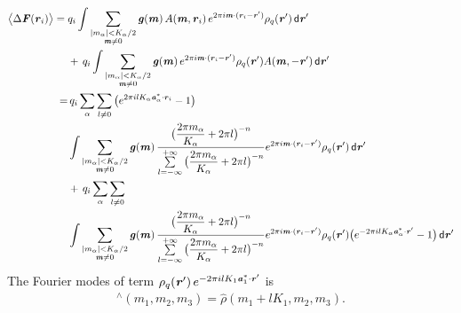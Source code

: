 \documentclass[aps,pre,preprint]{revtex4}
\renewcommand{\v}[1]{\textbf{\textit{#1}}}
\renewcommand{\d}[1]{\textsf{#1}}
\begin{document}
\begin{align}\nonumber
  \big\langle
  \Delta\v F(\v r_i)
  \big\rangle
  =\;&
  q_i
  \int 
  \sum_{
    \begin{subarray}{c}
      \vert m_{\alpha}\vert < K_\alpha/2\\
      \v m\neq 0
    \end{subarray}}
  \v g(\v m)\,
  A(\v m, \v r_i)\,
  e^{2\pi i\v m\cdot (\v r_i - \v r')}
  \rho_q(\v r')\,\d d\v r' \\ \nonumber
  & +\,
  q_i
  \int
  \sum_{
    \begin{subarray}{c}
      \vert m_{\alpha}\vert < K_\alpha/2\\
      \v m\neq 0
    \end{subarray}}
  \v g(\v m)\,
  e^{2\pi i\v m\cdot (\v r_i - \v r')}
  \rho_q(\v r')A(\v m, -\v r')\,\d d\v r' \\\nonumber
  = &\,
  q_i\sum_{\alpha}\sum_{l\neq 0}
  \big(
  e^{2\pi i l K_\alpha\v a^\ast_\alpha\cdot \v r_i} - 1
  \big) \\\nonumber
  &
  \int 
  \sum_{
    \begin{subarray}{c}
      \vert m_{\alpha}\vert < K_\alpha/2\\
      \v m\neq 0
    \end{subarray}}
  \v g(\v m)\,
  \frac
  {\big(\dfrac{2\pi m_\alpha}{K_\alpha} + 2\pi l\big)^{-n}}
  {\sum\limits_{l=-\infty}^{+\infty}
    \big(\dfrac{2\pi m_\alpha}{K_\alpha} + 2\pi l\big)^{-n}}
  e^{2\pi i\v m\cdot (\v r_i - \v r')}
  \rho_q(\v r')\,\d d\v r' \\ \nonumber
  &+ \,
  q_i\sum_{\alpha}\sum_{l\neq 0} \\ \nonumber
  &
  \int
  \sum_{
    \begin{subarray}{c}
      \vert m_{\alpha}\vert < K_\alpha/2\\
      \v m\neq 0
    \end{subarray}}
  \v g(\v m)\,
  \frac
  {\big(\dfrac{2\pi m_\alpha}{K_\alpha} + 2\pi l\big)^{-n}}
  {\sum\limits_{l=-\infty}^{+\infty}
    \big(\dfrac{2\pi m_\alpha}{K_\alpha} + 2\pi l\big)^{-n}}
  e^{2\pi i\v m\cdot (\v r_i - \v r')}
  \rho_q(\v r')
  \big(
  e^{-2\pi i l K_\alpha\v a^\ast_\alpha\cdot \v r'} - 1
  \big)
  \,\d d\v r' 
\end{align}
The Fourier modes of term $\rho_q(\v r')\,
e^{-2\pi i l K_1\v a^\ast_1\cdot \v r'}$ is
\begin{align}
  [\,\rho_q(\v r')\,e^{-2\pi i l K_1\v a^\ast_1\cdot \v r'}\,] ^\wedge
  (m_1, m_2, m_3)
  = \hat\rho(m_1+lK_1, m_2, m_3).
\end{align}
\end{document}
